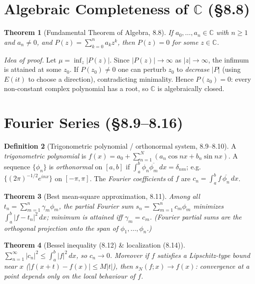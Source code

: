 \documentclass[11pt]{article}
\theoremstyle{definition}
\newtheorem{definition}{Definition}[section]
\theoremstyle{plain}
\newtheorem{theorem}[definition]{Theorem}
\newcommand{\C}{\mathbb{C}}
\newcommand{\abs}[1]{\left\lvert #1 \right\rvert}
\renewcommand{\to}{\longrightarrow}
\begin{document}
\section{Algebraic Completeness of $\C$ (\S8.8)}

\begin{theorem}[Fundamental Theorem of Algebra, 8.8]
If $a_0,\dots,a_n\in\C$ with $n\ge 1$ and $a_n\neq 0$, and
$P(z)=\sum_{k=0}^{n} a_k z^k$, then $P(z)=0$ for some $z\in\C$.
\end{theorem}

\noindent\emph{Idea of proof.} Let $\mu=\inf_{z}\abs{P(z)}$. Since
$\abs{P(z)}\to\infty$ as $\abs{z}\to\infty$, the infimum is attained at some
$z_0$. If $P(z_0)\neq 0$ one can perturb $z_0$ to \emph{decrease} $\abs{P}$
(using $E(it)$ to choose a direction), contradicting minimality. Hence
$P(z_0)=0$: every non-constant complex polynomial has a root, so $\C$ is
algebraically closed.

\section{Fourier Series (\S8.9--8.16)}

\begin{definition}[Trigonometric polynomial / orthonormal system, 8.9--8.10]
A \emph{trigonometric polynomial} is $f(x)=a_0+\sum_{n=1}^{N}(a_n\cos nx+b_n\sin nx)$.
A sequence $\{\phi_n\}$ is \emph{orthonormal} on $[a,b]$ if
$\int_a^b \phi_n\overline{\phi_m}\,dx=\delta_{nm}$; e.g.\ $\{(2\pi)^{-1/2}e^{inx}\}$
on $[-\pi,\pi]$. The \emph{Fourier coefficients} of $f$ are
$c_n=\int_a^b f\,\overline{\phi_n}\,dx$.
\end{definition}

\begin{theorem}[Best mean-square approximation, 8.11]
Among all $t_n=\sum_{m=1}^{n}\gamma_m\phi_m$, the partial Fourier sum
$s_n=\sum_{m=1}^{n} c_m\phi_m$ minimizes $\int_a^b\abs{f-t_n}^2\,dx$; minimum is
attained \emph{iff} $\gamma_m=c_m$. (Fourier partial sums are the orthogonal
projection onto the span of $\phi_1,\dots,\phi_n$.)
\end{theorem}

\begin{theorem}[Bessel inequality (8.12) \& localization (8.14)]
$\displaystyle\sum_{n=1}^{\infty}\abs{c_n}^2\le\int_a^b\abs{f}^2\,dx$, so $c_n\to 0$.
Moreover if $f$ satisfies a Lipschitz-type bound near $x$
($\abs{f(x+t)-f(x)}\le M\abs{t}$), then $s_N(f;x)\to f(x)$: convergence at a
point depends only on the \emph{local} behaviour of $f$.
\end{theorem}
\end{document}
